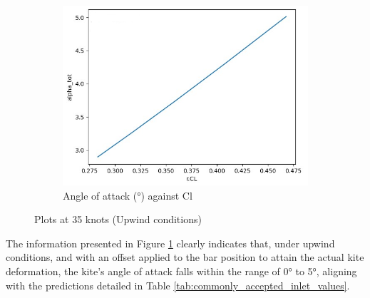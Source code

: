 \begin{figure}[H]
\begin{subfigure}{0.5\textwidth}
    \includegraphics[width=\textwidth]{figures/Optimization/3D/moment equilibre alpha.png}
    \caption{Angle of attack (°) against Cl}
  \end{subfigure}
  \caption{Plots at 35 knots (Upwind conditions)}
  \label{Plots at 35 knots (Upwind conditions)}
\end{figure}

The information presented in Figure \ref{Plots at 35 knots (Upwind conditions)} clearly indicates that, under upwind conditions, and with an offset applied to the bar position to attain the actual kite deformation, the kite's angle of attack falls within the range of 0° to 5°, aligning with the predictions detailed in Table \ref{tab:commonly_accepted_inlet_values}.
